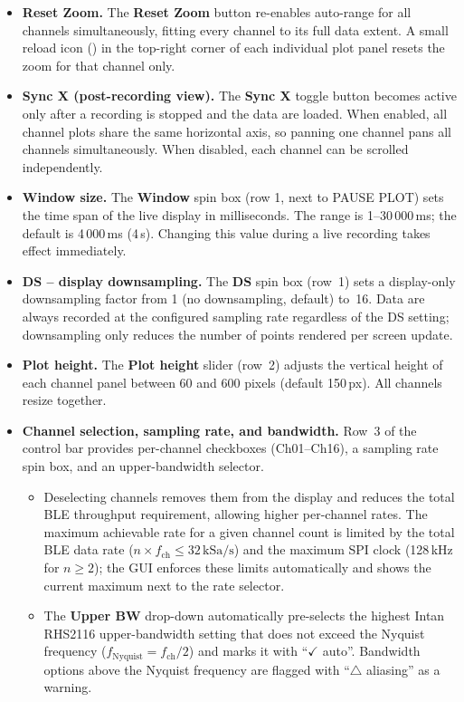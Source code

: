 \begin{itemize}
    \item \textbf{Reset Zoom.}
    The \textbf{Reset Zoom} button re-enables auto-range for all channels
    simultaneously, fitting every channel to its full data extent.
    A small reload icon (\raisebox{0pt}{$\circlearrowleft$}) in the
    top-right corner of each individual plot panel resets the zoom for that
    channel only.

    \item \textbf{Sync X (post-recording view).}
    The \textbf{Sync X} toggle button becomes active only after a recording
    is stopped and the data are loaded. When enabled, all channel plots share
    the same horizontal axis, so panning one channel pans all channels
    simultaneously. When disabled, each channel can be scrolled independently.

    \item \textbf{Window size.}
    The \textbf{Window} spin box (row 1, next to PAUSE PLOT) sets the time
    span of the live display in milliseconds. The range is 1--30\,000\,ms;
    the default is 4\,000\,ms (4\,s). Changing this value during a live
    recording takes effect immediately.

    \item \textbf{DS -- display downsampling.}
    The \textbf{DS} spin box (row~1) sets a display-only downsampling factor
    from 1 (no downsampling, default) to~16. Data are always recorded at the
    configured sampling rate regardless of the DS setting; downsampling only
    reduces the number of points rendered per screen update.

    \item \textbf{Plot height.}
    The \textbf{Plot height} slider (row~2) adjusts the vertical height of
    each channel panel between 60 and 600 pixels (default 150\,px). All
    channels resize together.

    \item \textbf{Channel selection, sampling rate, and bandwidth.}
    Row~3 of the control bar provides per-channel checkboxes (Ch01--Ch16),
    a sampling rate spin box, and an upper-bandwidth selector.
    \begin{itemize}
        \item Deselecting channels removes them from the display and reduces
        the total BLE throughput requirement, allowing higher per-channel
        rates. The maximum achievable rate for a given channel count is
        limited by the total BLE data rate ($n \times f_\text{ch} \le
        32\,\text{kSa/s}$) and the maximum SPI clock (128\,kHz for
        $n \ge 2$); the GUI enforces these limits automatically and shows
        the current maximum next to the rate selector.
        \item The \textbf{Upper BW} drop-down automatically pre-selects
        the highest Intan RHS2116 upper-bandwidth setting that does not
        exceed the Nyquist frequency ($f_\text{Nyquist} = f_\text{ch}/2$)
        and marks it with ``$\checkmark$ auto''. Bandwidth options above
        the Nyquist frequency are flagged with ``$\triangle$ aliasing'' as
        a warning.
    \end{itemize}


\end{itemize}
